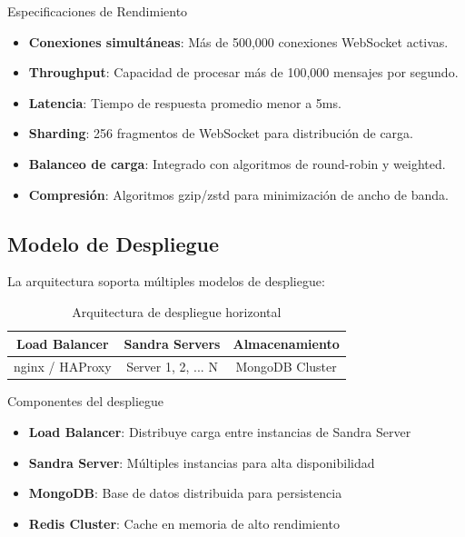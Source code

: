 \begin{caja}{Especificaciones de Rendimiento}
\begin{itemize}
\item \textbf{Conexiones simultáneas}: Más de 500,000 conexiones WebSocket activas.
\item \textbf{Throughput}: Capacidad de procesar más de 100,000 mensajes por segundo.
\item \textbf{Latencia}: Tiempo de respuesta promedio menor a 5ms.
\item \textbf{Sharding}: 256 fragmentos de WebSocket para distribución de carga.
\item \textbf{Balanceo de carga}: Integrado con algoritmos de round-robin y weighted.
\item \textbf{Compresión}: Algoritmos gzip/zstd para minimización de ancho de banda.
\end{itemize}
\end{caja}

\subsection{Modelo de Despliegue}

La arquitectura soporta múltiples modelos de despliegue:

\begin{table}[H]
\centering
\caption{Arquitectura de despliegue horizontal}
\begin{tabular}{|c|c|c|}
\hline
\textbf{Load Balancer} & \textbf{Sandra Servers} & \textbf{Almacenamiento} \\
\hline
nginx / HAProxy & Server 1, 2, ... N & MongoDB Cluster \\
\hline
\end{tabular}
\end{table}

\begin{caja}{Componentes del despliegue}
\begin{itemize}
\item \textbf{Load Balancer}: Distribuye carga entre instancias de Sandra Server
\item \textbf{Sandra Server}: Múltiples instancias para alta disponibilidad
\item \textbf{MongoDB}: Base de datos distribuida para persistencia
\item \textbf{Redis Cluster}: Cache en memoria de alto rendimiento
\end{itemize}
\end{caja}

